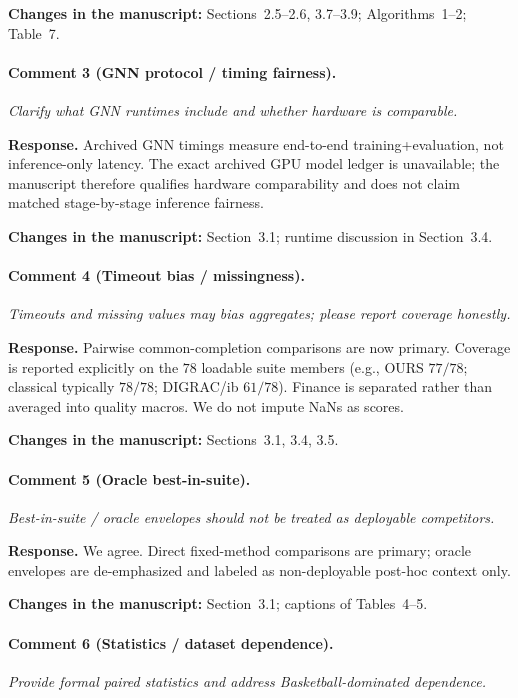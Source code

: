\documentclass[11pt]{article}
\newcommand{\commentbox}[1]{\par\textit{#1}\par\medskip}
\newcommand{\changes}[1]{\textbf{Changes in the manuscript:} #1\par\medskip}
\begin{document}
\changes{Sections~2.5--2.6, 3.7--3.9; Algorithms~1--2; Table~7.}

\paragraph{Comment 3 (GNN protocol / timing fairness).}
\commentbox{Clarify what GNN runtimes include and whether hardware is comparable.}

\noindent\textbf{Response.}
Archived GNN timings measure end-to-end training+evaluation, not inference-only latency. The exact archived GPU model ledger is unavailable; the manuscript therefore qualifies hardware comparability and does not claim matched stage-by-stage inference fairness.

\changes{Section~3.1; runtime discussion in Section~3.4.}

\paragraph{Comment 4 (Timeout bias / missingness).}
\commentbox{Timeouts and missing values may bias aggregates; please report coverage honestly.}

\noindent\textbf{Response.}
Pairwise common-completion comparisons are now primary. Coverage is reported explicitly on the $78$ loadable suite members (e.g., OURS $77/78$; classical typically $78/78$; DIGRAC/ib $61/78$). Finance is separated rather than averaged into quality macros. We do not impute NaNs as scores.

\changes{Sections~3.1, 3.4, 3.5.}

\paragraph{Comment 5 (Oracle best-in-suite).}
\commentbox{Best-in-suite / oracle envelopes should not be treated as deployable competitors.}

\noindent\textbf{Response.}
We agree. Direct fixed-method comparisons are primary; oracle envelopes are de-emphasized and labeled as non-deployable post-hoc context only.

\changes{Section~3.1; captions of Tables~4--5.}

\paragraph{Comment 6 (Statistics / dataset dependence).}
\commentbox{Provide formal paired statistics and address Basketball-dominated dependence.}
\end{document}
